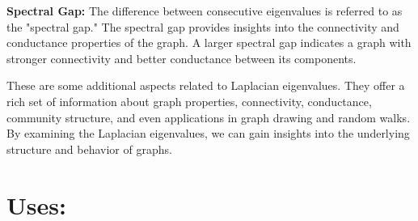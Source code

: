 \documentclass{article}
\begin{document}
\textbf{Spectral Gap:} The difference between consecutive eigenvalues is referred to as the "spectral gap." The spectral gap provides insights into the connectivity and conductance properties of the graph. A larger spectral gap indicates a graph with stronger connectivity and better conductance between its components.

These are some additional aspects related to Laplacian eigenvalues. They offer a rich set of information about graph properties, connectivity, conductance, community structure, and even applications in graph drawing and random walks. By examining the Laplacian eigenvalues, we can gain insights into the underlying structure and behavior of graphs.

\section*{Uses:}
\end{document}

